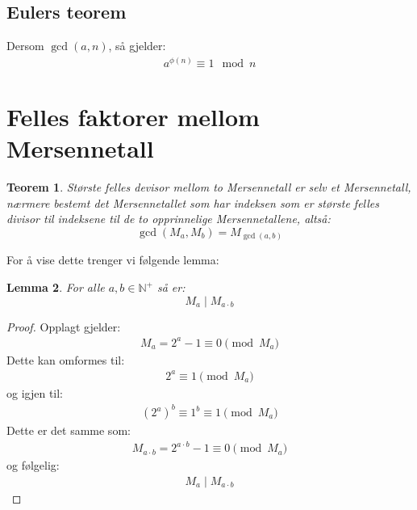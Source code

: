 \documentclass[a4paper,twoside]{article}
\theoremstyle{plain}
\newtheorem{thm}{Teorem}[section]
\newtheorem{lemma}[thm]{Lemma}
\newcommand{\setNp}{\mathbb{N}^+}
\begin{document}
\subsection{Eulers teorem}
Dersom $\gcd(a,n)$, så gjelder:
\begin{align}
	a^{\phi(n)} \equiv 1 \mod n
\end{align}

\section{Felles faktorer mellom Mersennetall}
\begin{thm}
	Største felles devisor mellom to Mersennetall er selv et Mersennetall, nærmere bestemt det Mersennetallet som har indeksen som er største felles divisor til indeksene til de to opprinnelige  Mersennetallene, altså:\[\gcd\left(M_a,M_b\right)=M_{\gcd(a,b)} \]
\end{thm}
For å vise dette trenger vi følgende lemma:

\begin{lemma}
	For alle $a,b \in \setNp$ så er:
\[ M_a\mid M_{a\cdot b} \]

\end{lemma}
\begin{proof}
Opplagt gjelder:
\begin{align}
M_a = 2^a-1\equiv 0 \pmod{M_a}
\end{align}
Dette kan omformes til:
\begin{align}
2^a \equiv 1  \pmod{M_a}
\end{align}
og igjen til:
\begin{align}
\left(2^a\right)^b\equiv 1^b\equiv 1 \pmod{M_a}
\end{align}
Dette er det samme som:
\begin{align}
M_{a\cdot b}=2^{a\cdot b}-1\equiv 0 \pmod{M_a}
\end{align}
og følgelig:
 \begin{align}
 M_a\mid M_{a\cdot b}
 \end{align}
\end{proof}
\end{document}
